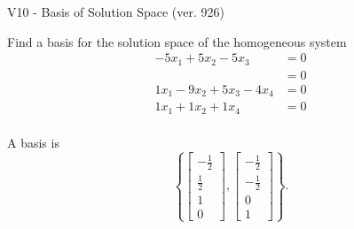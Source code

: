 \begin{exercise}
  \begin{exerciseTitle}V10 - Basis of Solution Space (ver. 926)\end{exerciseTitle}
  \begin{exerciseStatement}
    Find a basis for the solution space of the homogeneous system 
\begin{align*}
 -5 x_ 1 + 5 x_ 2 -5 x_ 3 &= 0  \\ 
  &= 0  \\ 
  1 x_ 1 -9 x_ 2 + 5 x_ 3 -4 x_ 4 &= 0  \\ 
  1 x_ 1 + 1 x_ 2 + 1 x_ 4 &= 0  \\ 
 \end{align*}


 
  \end{exerciseStatement}

  \begin{exerciseAnswer}
   A basis is   
\[\left\{\left[\begin{array}{c}
-\frac{1}{2} \\
\frac{1}{2} \\
1 \\
0
\end{array}\right] , \left[\begin{array}{c}
-\frac{1}{2} \\
-\frac{1}{2} \\
0 \\
1
\end{array}\right]\right\}.\]

  


  \end{exerciseAnswer}
\end{exercise}